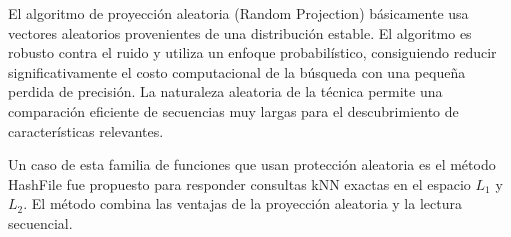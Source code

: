 



El algoritmo de proyección aleatoria (Random Projection) básicamente usa vectores aleatorios provenientes de una distribución estable. El algoritmo es robusto contra el ruido y utiliza un enfoque probabilístico, consiguiendo reducir significativamente el costo computacional de la búsqueda con una pequeña perdida de precisión. La naturaleza aleatoria de la técnica permite una comparación eficiente de secuencias muy largas para el descubrimiento de características relevantes.

Un caso de esta familia de funciones que usan protección aleatoria  es  el  método HashFile \cite{lshHashFile}  fue propuesto para responder consultas kNN exactas en el espacio $L_1$  y $L_2$. El método combina las ventajas de la proyección aleatoria  y la  lectura secuencial. 


